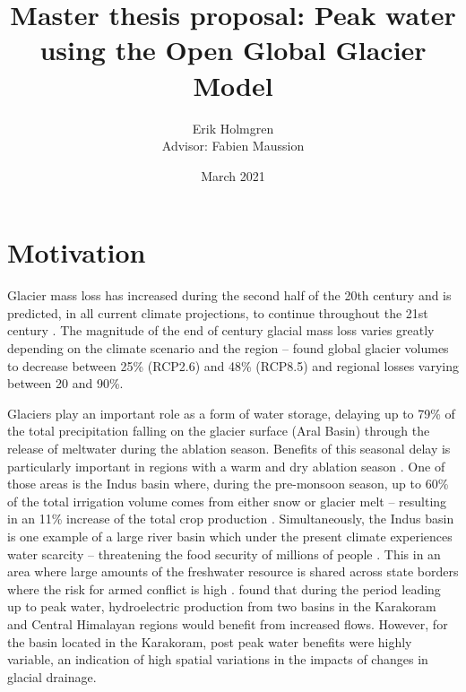 \documentclass[12pt, a4paper]{article}
\author{Erik Holmgren \\ Advisor: Fabien Maussion}
\title{Master thesis proposal: Peak water using the Open Global Glacier Model}
\date{March 2021}
\begin{document}
\maketitle
\noindent
\section{Motivation}
Glacier mass loss has increased during the second half of the 20th century
\parencite{vaughanObservationsCryosphere2013} and is predicted, in all current
climate projections, to continue throughout the 21st century
\parencite{ipccClimateChange20142014}. The magnitude of the end of century
glacial mass loss varies greatly depending on the climate scenario and the
region -- \textcite{hussNewModelGlobal2015} found global glacier volumes to
decrease between 25\% (RCP2.6) and 48\% (RCP8.5) and regional losses varying
between 20 and 90\%.



Glaciers play an important role as a form of water storage, delaying up to 79\%
of the total precipitation falling on the glacier surface (Aral Basin) through
the release of meltwater during the ablation season. Benefits of this seasonal
delay is particularly important in regions with a warm and dry ablation season
\parencite{kaserContributionPotentialGlaciers2010}. One of those areas is the
Indus basin where, during the pre-monsoon season, up to 60\% of the total
irrigation volume comes from either snow or glacier melt -- resulting in an 11\%
increase of the total crop production
\parencite{biemansImportanceSnowGlacier2019}. Simultaneously, the Indus basin is
one example of a large river basin which under the present climate experiences
water scarcity -- threatening the food security of millions of people
\parencite{kummuClimatedrivenInterannualVariability2014}. This in an area where
large amounts of the freshwater resource is shared across state borders where
the risk for armed conflict is high
\parencite{schleussnerArmedconflictRisksEnhanced2016,
pritchardAsiaShrinkingGlaciers2019}.
\textcite{mishraDifferentialImpactClimate2020} found that during the period
leading up to peak water, hydroelectric production from two basins in the
Karakoram and Central Himalayan regions would benefit from increased flows.
However, for the basin located in the Karakoram, post peak water benefits were
highly variable, an indication of high spatial variations in the impacts of
changes in glacial drainage.
\end{document}
